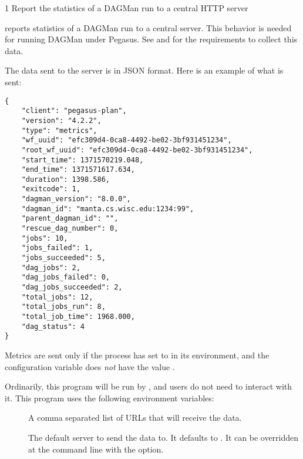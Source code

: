 \begin{ManPage}{\label{man-condor-dagman-metrics-reporter}}{1}
{Report the statistics of a DAGMan run to a central HTTP server}


\Synopsis {}

\Description

 reports statistics of a DAGMan run to a
central server.  This behavior is needed for running DAGMan under Pegasus.  
See 
and 
for the requirements to collect this data.

The data sent to the server is in JSON format.  
Here is an example of what is sent:
\begin{verbatim}
{
    "client": "pegasus-plan",
    "version": "4.2.2",
    "type": "metrics",
    "wf_uuid": "efc309d4-0ca8-4492-be02-3bf931451234",
    "root_wf_uuid": "efc309d4-0ca8-4492-be02-3bf931451234",
    "start_time": 1371570219.048,
    "end_time": 1371571617.634,
    "duration": 1398.586,
    "exitcode": 1,
    "dagman_version": "8.0.0",
    "dagman_id": "manta.cs.wisc.edu:1234:99",
    "parent_dagman_id": "",
    "rescue_dag_number": 0,
    "jobs": 10,
    "jobs_failed": 1,
    "jobs_succeeded": 5,
    "dag_jobs": 2,
    "dag_jobs_failed": 0,
    "dag_jobs_succeeded": 2,
    "total_jobs": 12,
    "total_jobs_run": 8,
    "total_job_time": 1968.000,
    "dag_status": 4
}
\end{verbatim}

Metrics are sent only if the  process has
 set to  in its environment,
and the  configuration variable does \emph{not}
have the value .

Ordinarily, this program will be run by , 
and users do not need to interact with it.
This program uses the following environment variables:
\begin{description}
  \item[]
    A comma separated list of URLs that will receive the data. 
  \item[]
    The default server to send the data to.
    It defaults to .
    It can be overridden at the command line with the  option.
\end{description}


\end{ManPage}
